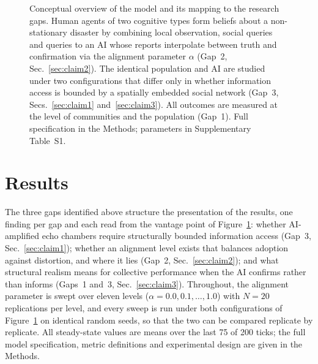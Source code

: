 \documentclass[sn-apacite]{sn-jnl}
\begin{document}
\begin{figure}[h]
{}
\caption{Conceptual overview of the model and its mapping to the research gaps. Human agents of two cognitive types form beliefs about a non-stationary disaster by combining local observation, social queries and queries to an AI whose reports interpolate between truth and confirmation via the alignment parameter $\alpha$ (Gap~2, Sec.~\ref{sec:claim2}). The identical population and AI are studied under two configurations that differ only in whether information access is bounded by a spatially embedded social network (Gap~3, Secs.~\ref{sec:claim1} and~\ref{sec:claim3}). All outcomes are measured at the level of communities and the population (Gap~1). Full specification in the Methods; parameters in Supplementary Table~S1.}\label{fig:concept}
\end{figure}

\section{Results}\label{sec:results}

The three gaps identified above structure the presentation of the results, one finding per gap and each read from the vantage point of Figure~\ref{fig:concept}: whether AI-amplified echo chambers require structurally bounded information access (Gap~3, Sec.~\ref{sec:claim1}); whether an alignment level exists that balances adoption against distortion, and where it lies (Gap~2, Sec.~\ref{sec:claim2}); and what structural realism means for collective performance when the AI confirms rather than informs (Gaps~1 and~3, Sec.~\ref{sec:claim3}). Throughout, the alignment parameter is swept over eleven levels ($\alpha = 0.0, 0.1, \ldots, 1.0$) with $N = 20$ replications per level, and every sweep is run under both configurations of Figure~\ref{fig:concept} on identical random seeds, so that the two can be compared replicate by replicate. All steady-state values are means over the last 75 of 200 ticks; the full model specification, metric definitions and experimental design are given in the Methods.
\end{document}
